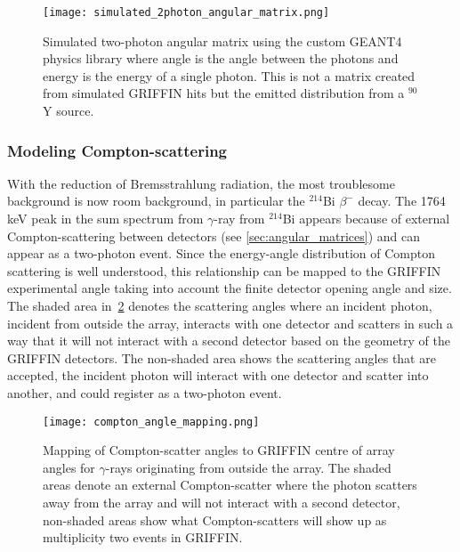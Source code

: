 \documentclass[cnatzke_thesis_proposal.tex]{subfiles}
\begin{document}
\begin{figure}[htbp]
  \centering
  \texttt{[image: simulated\_2photon\_angular\_matrix.png]}
  \caption{Simulated two-photon angular matrix using the custom GEANT4 physics library where angle is the angle between the photons and energy is the energy of a single photon. This is not a matrix created from simulated GRIFFIN hits but the emitted distribution from a $^{90}$Y source.}
  \label{fig:simulated_twophoton_angular_matrix}
\end{figure}

\subsubsection{Modeling Compton-scattering}
\label{sec:compton_scatter}
With the reduction of Bremsstrahlung radiation, the most troublesome background is now room background, in particular the $^{214}$Bi $\beta^-$ decay.
The 1764 keV peak in the sum spectrum from $\gamma$-ray from $^{214}$Bi appears because of external Compton-scattering between detectors (see \ref{sec:angular_matrices}) and can appear as a two-photon event.
Since the energy-angle distribution of Compton scattering is well understood, this relationship can be mapped to the GRIFFIN experimental angle taking into account the finite detector opening angle and size.
The shaded area in~\ref{fig:compton_angle_mapping} denotes the scattering angles where an incident photon, incident from outside the array, interacts with one detector and scatters in such a way that it will not interact with a second detector based on the geometry of the GRIFFIN detectors. 
The non-shaded area shows the scattering angles that are accepted, the incident photon will interact with one detector and scatter into another, and could register as a two-photon event.


\begin{figure}[htbp]
  \centering
  \texttt{[image: compton\_angle\_mapping.png]}
  \caption{Mapping of Compton-scatter angles to GRIFFIN centre of array angles for $\gamma$-rays originating from outside the array. The shaded areas denote an external Compton-scatter where the photon scatters away from the array and will not interact with a second detector, non-shaded areas show what Compton-scatters will show up as multiplicity two events in GRIFFIN.}
  \label{fig:compton_angle_mapping}
\end{figure}
\end{document}
